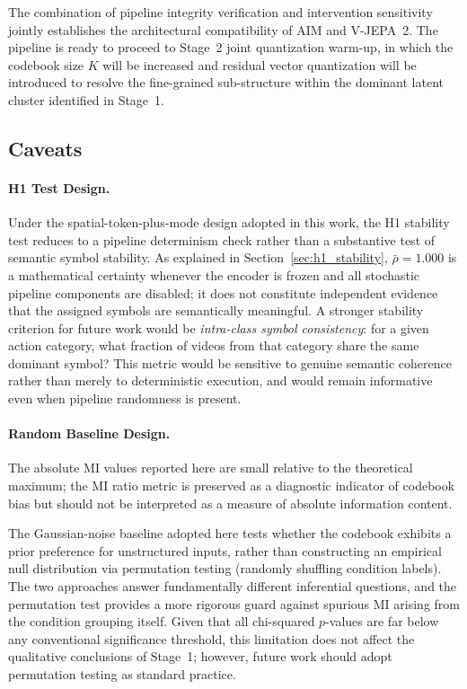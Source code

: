 \documentclass{article}
\begin{document}
The combination of pipeline integrity verification and intervention
sensitivity jointly establishes the architectural compatibility of
AIM and V-JEPA~2.
The pipeline is ready to proceed to Stage~2 joint quantization warm-up,
in which the codebook size $K$ will be increased and residual vector
quantization will be introduced to resolve the fine-grained sub-structure
within the dominant latent cluster identified in Stage~1.

\subsection{Caveats}

\paragraph{H1 Test Design.}
Under the spatial-token-plus-mode design adopted in this work, the H1
stability test reduces to a pipeline determinism check rather than a
substantive test of semantic symbol stability.  As explained in
Section~\ref{sec:h1_stability}, $\bar{\rho} = 1.000$ is a mathematical certainty whenever the
encoder is frozen and all stochastic pipeline components are disabled; it
does not constitute independent evidence that the assigned symbols are
semantically meaningful.  A stronger stability criterion for future work
would be \emph{intra-class symbol consistency}: for a given action category,
what fraction of videos from that category share the same dominant symbol?
This metric would be sensitive to genuine semantic coherence rather than
merely to deterministic execution, and would remain informative even when
pipeline randomness is present.

\paragraph{Random Baseline Design.}
The absolute MI values reported here are small relative to the theoretical maximum; the MI ratio metric is preserved as a diagnostic indicator of codebook bias but should not be interpreted as a measure of absolute information content.

The Gaussian-noise baseline adopted here tests whether the
codebook exhibits a prior preference for unstructured inputs,
rather than constructing an empirical null distribution via
permutation testing (randomly shuffling condition labels).
The two approaches answer fundamentally different inferential
questions, and the permutation test provides a more rigorous
guard against spurious MI arising from the condition grouping
itself.  Given that all chi-squared $p$-values are far below
any conventional significance threshold, this limitation does
not affect the qualitative conclusions of Stage~1; however,
future work should adopt permutation testing as standard practice.
\end{document}
